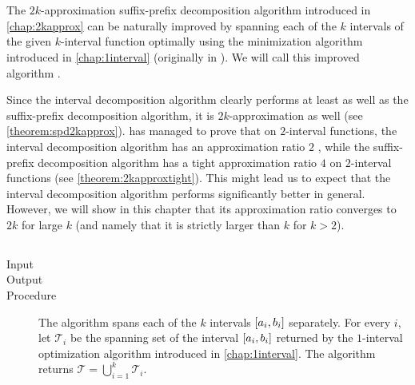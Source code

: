 \chapter{}
\label{chap:betterapprox}

The $2k$-approximation
suffix-prefix decomposition algorithm
introduced in \cref{chap:2kapprox}
can be naturally improved
by spanning each of the $k$ intervals
of the given $k$-interval function
optimally using the minimization algorithm
introduced in \cref{chap:1interval}
(originally in \citet{Schieber2005154}).
We will call this improved algorithm
.

Since the interval decomposition algorithm
clearly performs at least as well
as the suffix-prefix decomposition algorithm,
it is $2k$-approximation as well
(see \cref{theorem:spd2kapprox}).
\citeauthor{Dubovsky2012} has managed
to prove that on $2$-interval functions,
the interval decomposition algorithm
has an approximation ratio $2$
\citep[p.~39]{Dubovsky2012}, %
while the suffix-prefix decomposition algorithm
has a tight approximation ratio $4$
on $2$-interval functions
(see \cref{theorem:2kapproxtight}).
This might lead us to expect
that the interval decomposition algorithm
performs significantly better in general.
However,
we will show in this chapter that its approximation ratio
converges to $2k$ for large $k$
(and namely that it is strictly larger than $k$
for $k > 2$).

\section{\algdesctitle}


\begin{algorithm}
\label{algorithm:id}

\hfill

\begin{description}
\item[Input]
\minintinput

\item[Output]
\minintoutput

\item[Procedure]
The algorithm spans each of the $k$ intervals
$[a_i, b_i]$ separately.
For every $i$,
let $\mathcal{T}_i$ be the spanning set of the interval
$[a_i, b_i]$ returned by the $1$-interval
optimization algorithm
introduced in \cref{chap:1interval}.
The algorithm returns
$\mathcal{T} = \bigcup_{i=1}^k{\mathcal{T}_i}$.
\end{description}
\end{algorithm}

